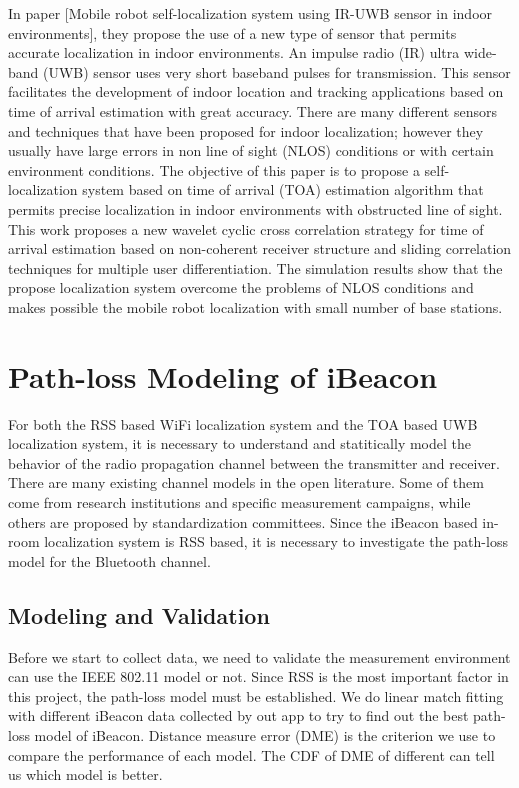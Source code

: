 \documentclass[12pt]{report}
\begin{document}
In paper [Mobile robot self-localization system using IR-UWB sensor in indoor environments], they propose the use of a new type of sensor that permits accurate localization in indoor environments. An impulse radio (IR) ultra wide-band (UWB) sensor uses very short baseband pulses for transmission. This sensor facilitates the development of indoor location and tracking applications based on time of arrival estimation with great accuracy. There are many different sensors and techniques that have been proposed for indoor localization; however they usually have large errors in non line of sight (NLOS) conditions or with certain environment conditions. The objective of this paper is to propose a self-localization system based on time of arrival (TOA) estimation algorithm that permits precise localization in indoor environments with obstructed line of sight. This work proposes a new wavelet cyclic cross correlation strategy for time of arrival estimation based on non-coherent receiver structure and sliding correlation techniques for multiple user differentiation. The simulation results show that the propose localization system overcome the problems of NLOS conditions and makes possible the mobile robot localization with small number of base stations.

\section{Path-loss Modeling of iBeacon}
For both the RSS based WiFi localization system and the TOA based UWB localization system, it is necessary to understand and statitically model the behavior of the radio propagation channel between the transmitter and receiver. There are many existing channel models in the open literature. Some of them come from research institutions and specific measurement campaigns, while others are proposed by standardization committees. Since the iBeacon based in-room localization system is RSS based, it is necessary to investigate the path-loss model for the Bluetooth channel. 

\subsection{Modeling and Validation}
Before we start to collect data, we need to validate the measurement environment can use the IEEE 802.11 model or not. Since RSS is the most important factor in this project, the path-loss model must be established. We do linear match fitting with different iBeacon data collected by out app to try to find out the best path-loss model of iBeacon. Distance measure error (DME) is the criterion we use to compare the performance of each model. The CDF of DME of different can tell us which model is better.
\end{document}
